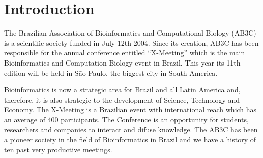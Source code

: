 \chapter{Introduction}
The Brazilian Association of Bioinformatics and Computational Biology (AB3C) is a scientific society funded in July 12th 2004. Since its creation, AB3C has been responsible for the annual conference entitled “X-Meeting” which is the main Bioinformatics and Computation Biology event in Brazil. This year its 11th edition will be held in São Paulo, the biggest city in South America.

	
Bioinformatics is now a strategic area for Brazil and all Latin America and, therefore, it is also strategic to the development of Science, Technology and Economy. The X-Meeting is a Brazilian event with international reach which has an average of 400 participants. The Conference is an opportunity for students, researchers and companies to interact and difuse knowledge. The AB3C has been a pioneer society in the field of Bioinformatics in Brazil and we have a history of ten past very productive meetings.